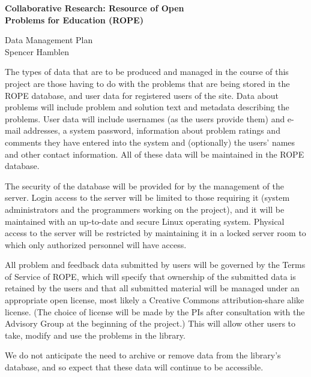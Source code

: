 \documentclass[11pt]{article}
\begin{document}
\begin{center}
{\Large \textbf{Collaborative Research: Resource of Open \\ 
Problems for Education (ROPE)}}

\bigskip

{\Large Data Management Plan}\\
\smallskip
Spencer Hamblen
\end{center}

The types of data that are to be produced and managed in the course of
this project are those having to do with the problems that are being
stored in the ROPE database, and user data for registered users of the
site.  Data about problems will include problem and solution text and
metadata describing the problems.  User data will include usernames (as
the users provide them) and e-mail addresses, a system password,
information about problem ratings and comments they have entered into the
system and (optionally) the users' names and other contact information.
All of these data will be maintained in the ROPE database.

The security of the database will be provided for by the management of the
server.  Login access to the server will be limited to those requiring it
(system administrators and the programmers working on the project), and it
will be maintained with an up-to-date and secure Linux operating system.
Physical access to the server will be restricted by maintaining it in a
locked server room to which only authorized personnel will have access.

All problem and feedback data submitted by users will be governed by the
Terms of Service of ROPE, which will specify that ownership of the
submitted data is retained by the users and that all submitted material
will be managed under an appropriate open license, most likely a Creative
Commons attribution-share alike license.  (The choice of license will be
made by the PIs after consultation with the Advisory Group at the
beginning of the project.)  This will allow other users to take, modify
and use the problems in the library.

We do not anticipate the need to archive or remove data from the library's
database, and so expect that these data will continue to be accessible.
\end{document}
